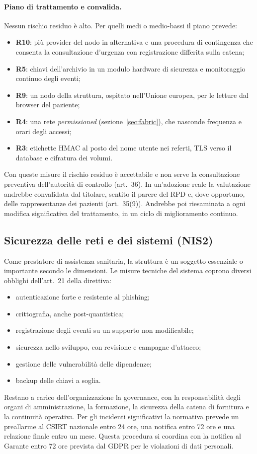 \paragraph{Piano di trattamento e convalida.} Nessun rischio residuo è alto. Per quelli medi o medio-bassi il piano prevede:
\begin{itemize}
  \item \textbf{R10}: più provider del nodo in alternativa e una procedura di contingenza che consenta la consultazione d'urgenza con registrazione differita sulla catena;
  \item \textbf{R5}: chiavi dell'archivio in un modulo hardware di sicurezza e monitoraggio continuo degli eventi;
  \item \textbf{R9}: un nodo della struttura, ospitato nell'Unione europea, per le letture dal browser del paziente;
  \item \textbf{R4}: una rete \emph{permissioned} (sezione~\ref{sec:fabric}), che nasconde frequenza e orari degli accessi;
  \item \textbf{R3}: etichette HMAC al posto del nome utente nei referti, TLS verso il database e cifratura dei volumi.
\end{itemize}
Con queste misure il rischio residuo è accettabile e non serve la consultazione preventiva dell'autorità di controllo (art.~36). In un'adozione reale la valutazione andrebbe convalidata dal titolare, sentito il parere del RPD e, dove opportuno, delle rappresentanze dei pazienti (art.~35(9)). Andrebbe poi riesaminata a ogni modifica significativa del trattamento, in un ciclo di miglioramento continuo.

\subsection{Sicurezza delle reti e dei sistemi (NIS2)}\label{sec:nis2}
Come prestatore di assistenza sanitaria, la struttura è un soggetto essenziale o importante secondo le dimensioni. Le misure tecniche del sistema coprono diversi obblighi dell'art.~21 della direttiva:
\begin{itemize}
  \item autenticazione forte e resistente al phishing;
  \item crittografia, anche post-quantistica;
  \item registrazione degli eventi su un supporto non modificabile;
  \item sicurezza nello sviluppo, con revisione e campagne d'attacco;
  \item gestione delle vulnerabilità delle dipendenze;
  \item backup delle chiavi a soglia.
\end{itemize}
Restano a carico dell'organizzazione la governance, con la responsabilità degli organi di amministrazione, la formazione, la sicurezza della catena di fornitura e la continuità operativa. Per gli incidenti significativi la normativa prevede un preallarme al CSIRT nazionale entro 24 ore, una notifica entro 72 ore e una relazione finale entro un mese. Questa procedura si coordina con la notifica al Garante entro 72 ore prevista dal GDPR per le violazioni di dati personali.

